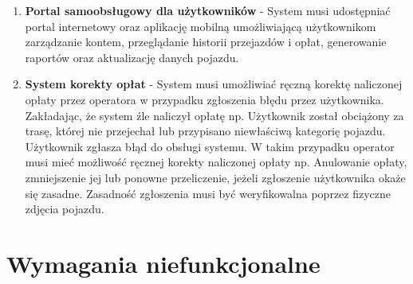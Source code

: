 \documentclass[12pt]{article}
\begin{document}
\begin{enumerate}
    \item \textbf{Portal samoobsługowy dla użytkowników} - System musi udostępniać portal internetowy oraz aplikację mobilną umożliwiającą użytkownikom zarządzanie kontem, przeglądanie historii przejazdów i opłat, generowanie raportów oraz aktualizację danych pojazdu.

    \item \textbf{System korekty opłat} - System musi umożliwiać ręczną korektę naliczonej opłaty przez operatora w przypadku zgłoszenia błędu przez użytkownika. Zakładając, że system źle naliczył opłatę np. Użytkownik został obciążony za trasę, której nie przejechał lub przypisano niewłaściwą kategorię pojazdu. Użytkownik zgłasza błąd do obsługi systemu. W takim przypadku operator musi mieć możliwość ręcznej korekty naliczonej opłaty np. Anulowanie opłaty, zmniejszenie jej lub ponowne przeliczenie, jeżeli zgłoszenie użytkownika okaże się zasadne. Zasadność zgłoszenia musi być weryfikowalna poprzez fizyczne zdjęcia pojazdu.
\end{enumerate}

\section{Wymagania niefunkcjonalne}
\end{document}
